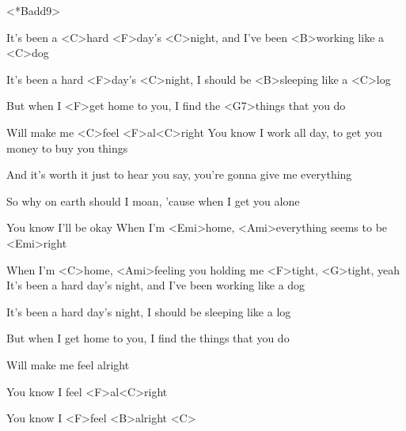 

<*Badd9>

\zs
%
It's been a <C>hard <F>day's <C>night, and I've been <B>working like a <C>dog

It's been a hard <F>day's <C>night, I should be <B>sleeping like a <C>log

But when I <F>get home to you, I find the <G7>things that you do

Will make me <C>feel <F>al<C>right
\ks
\zs
%
You know I work all day, to get you money to buy you things

And it's worth it just to hear you say, you're gonna give me everything

So why on earth should I moan, 'cause when I get you alone

You know I'll be okay
\ks
\zr
When I'm <Emi>home, <Ami>everything seems to be <Emi>right

When I'm <C>home, <Ami>feeling you holding me <F>tight, <G>tight, yeah
\kr
\zs
It's been a hard day's night, and I've been working like a dog

It's been a hard day's night, I should be sleeping like a log

But when I get home to you, I find the things that you do

Will make me feel alright

You know I feel <F>al<C>right

You know I <F>feel <B>alright <C> 
\ks
\kp
